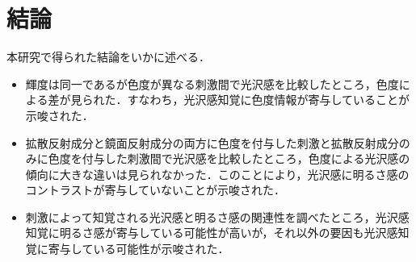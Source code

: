 \chapter{結論}

    本研究で得られた結論をいかに述べる．
    \begin{itemize}
        \item 輝度は同一であるが色度が異なる刺激間で光沢感を比較したところ，色度による差が見られた．すなわち，光沢感知覚に色度情報が寄与していることが示唆された．
        \item 拡散反射成分と鏡面反射成分の両方に色度を付与した刺激と拡散反射成分のみに色度を付与した刺激間で光沢感を比較したところ，色度による光沢感の傾向に大きな違いは見られなかった．このことにより，光沢感に明るさ感のコントラストが寄与していないことが示唆された．
        \item 刺激によって知覚される光沢感と明るさ感の関連性を調べたところ，光沢感知覚に明るさ感が寄与している可能性が高いが，それ以外の要因も光沢感知覚に寄与している可能性が示唆された．
    \end{itemize}
    \newpage